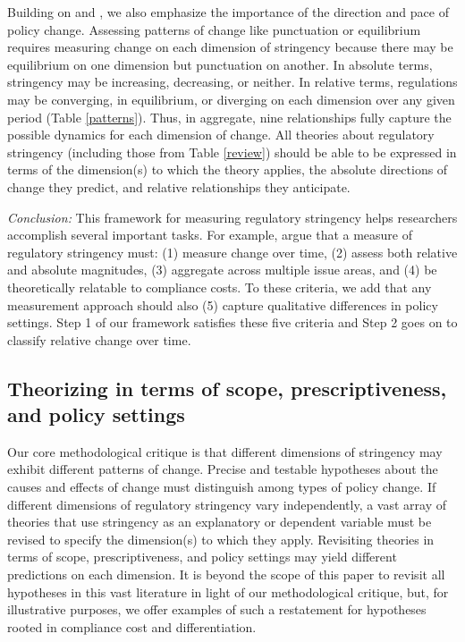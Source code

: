 \documentclass[
      12pt,
            Review ]{article}
\begin{document}
Building on \citet{Baumgartner2002} and \citet{Howlett2007}, we also emphasize the importance of the direction and pace of policy change. Assessing patterns of change like punctuation or equilibrium requires measuring change on each dimension of stringency because there may be equilibrium on one dimension but punctuation on another. In absolute terms, stringency may be increasing, decreasing, or neither. In relative terms, regulations may be converging, in equilibrium, or diverging on each dimension over any given period (Table \ref{patterns}). Thus, in aggregate, nine relationships fully capture the possible dynamics for each dimension of change. All theories about regulatory stringency (including those from Table \ref{review}) should be able to be expressed in terms of the dimension(s) to which the theory applies, the absolute directions of change they predict, and relative relationships they anticipate.



\emph{Conclusion:} This framework for measuring regulatory stringency helps researchers accomplish several important tasks. For example, \citet{Brunel2016} argue that a measure of regulatory stringency must: (1) measure change over time, (2) assess both relative and absolute magnitudes, (3) aggregate across multiple issue areas, and (4) be theoretically relatable to compliance costs. To these criteria, we add that any measurement approach should also (5) capture qualitative differences in policy settings. Step 1 of our framework satisfies these five criteria and Step 2 goes on to classify relative change over time.

\hypertarget{theorizing-in-terms-of-scope-prescriptiveness-and-policy-settings}{%
\subsection{Theorizing in terms of scope, prescriptiveness, and policy settings}\label{theorizing-in-terms-of-scope-prescriptiveness-and-policy-settings}}

Our core methodological critique is that different dimensions of stringency may exhibit different patterns of change. Precise and testable hypotheses about the causes and effects of change must distinguish among types of policy change. If different dimensions of regulatory stringency vary independently, a vast array of theories that use stringency as an explanatory or dependent variable must be revised to specify the dimension(s) to which they apply. Revisiting theories in terms of scope, prescriptiveness, and policy settings may yield different predictions on each dimension. It is beyond the scope of this paper to revisit all hypotheses in this vast literature in light of our methodological critique, but, for illustrative purposes, we offer examples of such a restatement for hypotheses rooted in compliance cost and differentiation.
\end{document}
